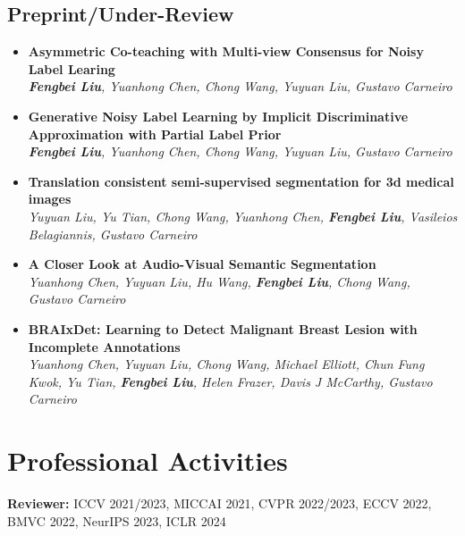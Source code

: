 \documentclass[letterpaper,11pt]{article}
\newcommand{\resumeArxivheading}[2]{
  \vspace{-2pt} \item\small{
    {\textbf{#1} \vspace{-2pt}}\\
    {\textit{\small#2}}
  }
}
\newcommand{\resumeSubHeadingListStart}{\begin{itemize}[leftmargin=0.15in, label={}]}
\newcommand{\resumeSubHeadingListEnd}{\end{itemize}}
\begin{document}
  \subsection*{Preprint/Under-Review}
  \resumeSubHeadingListStart
    \resumeArxivheading{Asymmetric Co-teaching with Multi-view Consensus for Noisy Label Learing}{\textbf{Fengbei Liu}, Yuanhong Chen, Chong Wang, Yuyuan Liu, Gustavo Carneiro}{}
    \resumeArxivheading{Generative Noisy Label Learning by Implicit Discriminative Approximation with Partial Label Prior}{\textbf{Fengbei Liu}, Yuanhong Chen, Chong Wang, Yuyuan Liu, Gustavo Carneiro}{}
    \resumeArxivheading{Translation consistent semi-supervised segmentation for 3d medical images}{Yuyuan Liu, Yu Tian, Chong Wang, Yuanhong Chen, \textbf{Fengbei Liu}, Vasileios Belagiannis, Gustavo Carneiro}{}
    \resumeArxivheading{A Closer Look at Audio-Visual Semantic Segmentation}{Yuanhong Chen, Yuyuan Liu, Hu Wang, \textbf{Fengbei Liu}, Chong Wang, Gustavo Carneiro}{}
    \resumeArxivheading{BRAIxDet: Learning to Detect Malignant Breast Lesion with Incomplete Annotations}{Yuanhong Chen, Yuyuan Liu, Chong Wang, Michael Elliott, Chun Fung Kwok, Yu Tian, \textbf{Fengbei Liu}, Helen Frazer, Davis J McCarthy, Gustavo Carneiro}{}
  \resumeSubHeadingListEnd


\section{Professional Activities}
  \vspace{2pt}
  \resumeSubHeadingListStart
    \small{\item{
        \textbf{Reviewer: }{ICCV 2021/2023, MICCAI 2021, CVPR 2022/2023, ECCV 2022, BMVC 2022, NeurIPS 2023, ICLR 2024} \\ \vspace{3pt}
        
    }}
  \resumeSubHeadingListEnd
\end{document}
